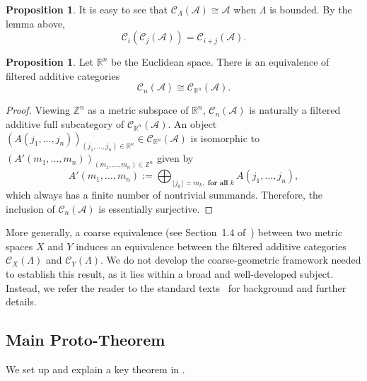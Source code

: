 \documentclass{article}
\theoremstyle{definition}
\newtheorem{prop}[theorem]{Proposition}
\newcommand{\CA}{{ \mathcal A}}
\newcommand{\CalC}{{\mathcal C}}
\newcommand{\ZZ}{{\mathbb Z}}
\newcommand{\RR}{{\mathbb R}}
\newcommand{\R}{\mathbb R}
\begin{document}
\begin{prop}
        It is easy to see that $\mathcal C_\Lambda(\CA)\cong \CA$ when $\Lambda$ is bounded. By the lemma above, $$\mathcal{C}_i(\mathcal{C}_j(\CA))=\mathcal C_{i+j}(\CA).$$
\end{prop}

\begin{prop}
    Let $\R^n$ be the Euclidean space. There is an equivalence of filtered additive categories
    $$\mathcal{C}_n(\CA)\cong \mathcal{C}_{\R^n}(\CA).$$
\end{prop}
\begin{proof}
   Viewing $\ZZ^n$ as a metric subspace of $\RR^n$, $\mathcal C_n(\CA)$ is naturally a filtered additive full subcategory of $\CalC_{\R^n}(\CA).$ An object $(A(j_1, \dots, j_n))_{(j_1, \dots, j_n)\in \R^n}\in \CalC_{\R^n}(\CA)$ is isomorphic to $(A'(m_1, \dots, m_n))_{(m_1, \dots, m_n)\in \ZZ^n}$ given by $$A'(m_1, \dots, m_n):=\bigoplus_{\lfloor j_k \rfloor=m_k, \textbf{ for all } k}A(j_1, \dots, j_n),$$ which always has a finite number of nontrivial summands. 
   Therefore, the inclusion of $\CalC_n(\CA)$ is essentially surjective. 
\end{proof}
More generally, a coarse equivalence (see Section~1.4 of~\cite{nowak2023large}) between two metric spaces $X$ and $Y$ induces an equivalence between the filtered additive categories $\mathcal C_X(\Lambda)$ and $\mathcal C_Y(\Lambda)$. We do not develop the coarse-geometric framework needed to establish this result, as it lies within a broad and well-developed subject. Instead, we refer the reader to the standard texts~\cite{roe2003lectures, nowak2023large} for background and further details.

\subsection{Main Proto-Theorem}

 We set up and explain a key theorem in \cite{pedersen1982ki}.
\end{document}
